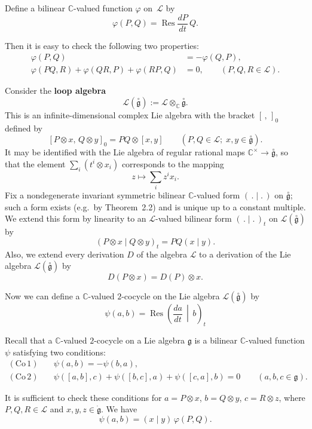 \documentclass[12pt]{article}
\begin{document}
Define a bilinear $\mathbb{C}$-valued function $\varphi$ on~$\mathcal{L}$ by
\[
\varphi(P,Q) = \operatorname{Res} \frac{dP}{dt} \, Q.
\]

Then it is easy to check the following two properties:
\begin{align}
\varphi(P,Q) &= -\varphi(Q,P), \tag{7.1.1}\\[4pt]
\varphi(PQ,R) + \varphi(QR,P) + \varphi(RP,Q) &= 0,
\qquad (P,Q,R \in \mathcal{L}). \tag{7.1.2}
\end{align}

Consider the \textbf{loop algebra}
\[
\mathcal{L}(\overset{\circ}{\mathfrak{g}}) := \mathcal{L} \otimes_{\mathbb{C}} \overset{\circ}{\mathfrak{g}}.
\]
This is an infinite-dimensional complex Lie algebra with the bracket $[\, ,\, ]_0$ defined by
\[
[P \otimes x,\, Q \otimes y]_0 = PQ \otimes [x,y] \qquad (P,Q \in \mathcal{L};\; x,y \in \overset{\circ}{\mathfrak{g}}).
\]
It may be identified with the Lie algebra of regular rational maps $\mathbb{C}^\times \to \overset{\circ}{\mathfrak{g}}$, so that the element $\sum_i (t^i \otimes x_i)$ corresponds to the mapping
\[
z \longmapsto \sum_i z^i x_i.
\]
Fix a nondegenerate invariant symmetric bilinear $\mathbb{C}$-valued form $(\,.\mid.\,)$ on $\overset{\circ}{\mathfrak{g}}$; such a form exists (e.g.\ by Theorem~2.2) and is unique up to a constant multiple.  
We extend this form by linearity to an $\mathcal{L}$-valued bilinear form $(\,.\mid.\,)_t$ on $\mathcal{L}(\overset{\circ}{\mathfrak{g}})$ by
\[
(P \otimes x \mid Q \otimes y)_t = PQ (x \mid y).
\]
Also, we extend every derivation $D$ of the algebra $\mathcal{L}$ to a derivation of the Lie algebra $\mathcal{L}(\overset{\circ}{\mathfrak{g}})$ by
\[
D(P \otimes x) = D(P) \otimes x.
\]

Now we can define a $\mathbb{C}$-valued $2$-cocycle on the Lie algebra $\mathcal{L}(\overset{\circ}{\mathfrak{g}})$ by
\[
\psi(a,b) = \operatorname{Res} \left( \frac{da}{dt} \,\middle|\, b \right)_t
\]

Recall that a $\mathbb{C}$-valued $2$-cocycle on a Lie algebra $\mathfrak{g}$ is a bilinear $\mathbb{C}$-valued function $\psi$ satisfying two conditions:
\begin{align*}
(\mathrm{Co}\,1) \quad & \psi(a,b) = -\psi(b,a), \\[2pt]
(\mathrm{Co}\,2) \quad & \psi([a,b],c) + \psi([b,c],a) + \psi([c,a],b) = 0 
\qquad (a,b,c \in \mathfrak{g}).
\end{align*}

It is sufficient to check these conditions for 
$a = P \otimes x$, $b = Q \otimes y$, $c = R \otimes z$, 
where $P,Q,R \in \mathcal{L}$ and $x,y,z \in \dot{\mathfrak{g}}$.  
We have
\[
\psi(a,b) = (x \mid y) \, \varphi(P,Q).
\]
\end{document}
